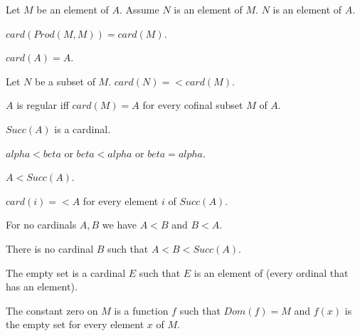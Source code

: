 \documentclass{article}
\begin{document}
\begin{forthel}
    \begin{axiom}[Transitivity]
      Let $M$ be an element of $A$. Assume $N$ is an element of $M$. $N$ is an element of $A$.
    \end{axiom}

    \begin{axiom}
      $card(Prod(M,M)) = card(M)$.
    \end{axiom}

    \begin{axiom}
      $card(A) = A$.
    \end{axiom}

    \begin{axiom}
      Let $N$ be a subset of $M$. $card(N) =< card(M)$.
    \end{axiom}

    \begin{definition}
      $A$ is regular iff $card(M) = A$ for every cofinal subset $M$ of $A$.
    \end{definition}

    \begin{signature}
      $Succ(A)$ is a cardinal.
    \end{signature}

    \begin{axiom}
      $alpha < beta$ or $beta < alpha$ or $beta = alpha$.
    \end{axiom}

    \begin{axiom}
      $A < Succ(A)$.
    \end{axiom}

    \begin{axiom}
      $card(i) =< A$ for every element $i$ of $Succ(A)$.
    \end{axiom}

    \begin{axiom}
      For no cardinals $A,B$ we have $A < B$ and $B < A$.
    \end{axiom}

    \begin{axiom}
      There is no cardinal $B$ such that $A < B < Succ(A)$.
    \end{axiom}

    \begin{definition}
      The empty set is a cardinal $E$ such that $E$ is an element of (every ordinal that has an element).
    \end{definition}

    \begin{definition}
      The constant zero on $M$ is a function $f$ such that $Dom(f) = M$ and $f(x)$ is the empty set for every element $x$ of $M$.
    \end{definition}


\end{forthel}
\end{document}
